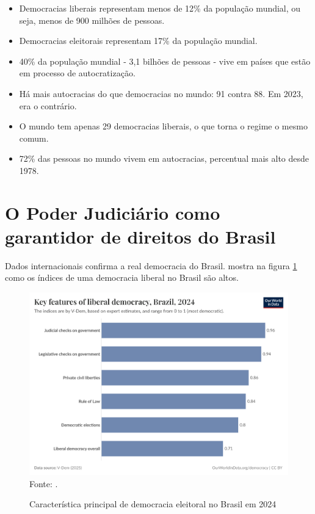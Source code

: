 \begin{itemize}
    \item Democracias liberais representam menos de 12\% da população mundial, ou seja, menos de 900 milhões de pessoas.
    \item Democracias eleitorais representam 17\% da população mundial.
    \item 40\%  da população mundial - 3,1 bilhões de pessoas - vive em países que estão em processo de autocratização.
    \item Há mais autocracias do que democracias no mundo: 91 contra 88. Em 2023, era o contrário.
    \item O mundo tem apenas 29 democracias liberais, o que torna o regime o mesmo comum.
    \item 72\% das pessoas no mundo vivem em autocracias, percentual mais alto desde 1978.
\end{itemize}

\section{O Poder Judiciário como garantidor de direitos do Brasil}

Dados internacionais confirma a real democracia do Brasil. \cite{rule-of-law-index} mostra na figura \ref{fig:key-features-of-liberal-democracy} como os índices de uma democracia liberal no Brasil são altos.

\begin{figure}[H]
	\centering
	\caption{Característica principal de democracia eleitoral no Brasil em 2024}
	\includegraphics[width=1\linewidth]{figuras/key-features-of-liberal-democracy.png}
	\label{fig:key-features-of-liberal-democracy}
	\footnotesize{Fonte: \cite{rule-of-law-index}.}
\end{figure}

